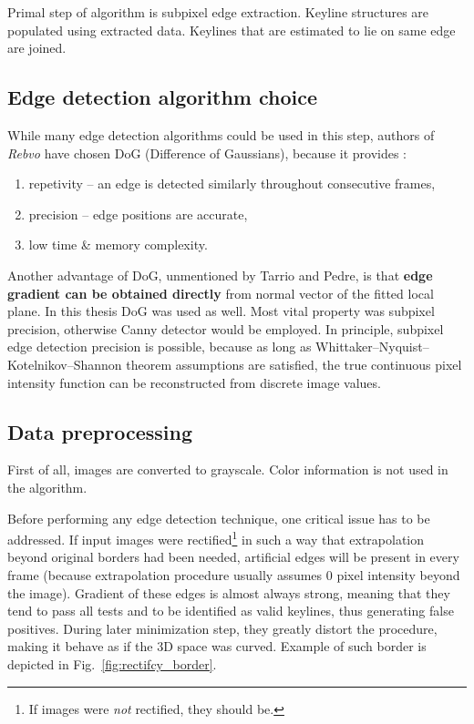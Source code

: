 Primal step of algorithm is subpixel edge extraction. Keyline structures are populated using extracted data. Keylines that are estimated to lie on same edge are joined.

\subsection{Edge detection algorithm choice}
While many edge detection algorithms could be used in this step, authors of \textit{Rebvo} have chosen DoG (Difference of Gaussians), because it provides \cite{jose2015realtime}:
\begin{enumerate}
	\item repetivity -- an edge is detected similarly throughout consecutive frames,
	\item precision -- edge positions are accurate,
	\item low time \& memory complexity.
\end{enumerate}

Another advantage of DoG, unmentioned by Tarrio and Pedre, is that \textbf{edge gradient can be obtained directly} from normal vector of the fitted local plane. In this thesis DoG was used as well. Most vital property was subpixel precision, otherwise Canny detector \cite{canny} would be employed. In principle, subpixel edge detection precision is possible, because as long as Whittaker–Nyquist–Kotelnikov–Shannon theorem assumptions are satisfied, the true continuous pixel intensity function can be reconstructed from discrete image values.

\subsection{Data preprocessing}

First of all, images are converted to grayscale. Color information is not used in the algorithm.

Before performing any edge detection technique, one critical issue has to be addressed. If input images were rectified\footnote{If images were \textit{not} rectified, they should be.} in such a way that extrapolation beyond original borders had been needed, artificial edges will be present in every frame (because extrapolation procedure usually assumes 0 pixel intensity beyond the image). Gradient of these edges is almost always strong, meaning that they tend to pass all tests and to be identified as valid keylines, thus generating false positives. During later minimization step, they greatly distort the procedure, making it behave as if the 3D space was curved. Example of such border is depicted in Fig.~\ref{fig:rectifcy_border}.

